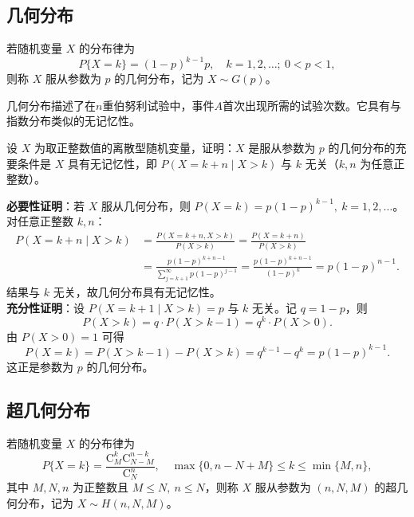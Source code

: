 ﻿\documentclass[lang=cn,11pt]{elegantbook}
\begin{document}
\subsection{几何分布} \label{subsec:geometric-dist}
\begin{definition}[几何分布] \label{def:geometric-dist}
若随机变量 $X$ 的分布律为
\[
P\{X = k\} = (1-p)^{k-1} p,\quad k=1,2,\dots;\ 0 < p < 1,
\]
则称 $X$ 服从参数为 $p$ 的几何分布，记为 $X \sim G(p)$。
\end{definition}

\begin{note}
几何分布描述了在$n$重伯努利试验中，事件$A$首次出现所需的试验次数。它具有与指数分布类似的无记忆性。
\end{note}

\begin{exercise}[几何分布的无记忆性] \label{exer:2-58}
设 $X$ 为取正整数值的离散型随机变量，证明：$X$ 是服从参数为 $p$ 的几何分布的充要条件是 $X$ 具有无记忆性，即 $P(X=k+n\mid X>k)$ 与 $k$ 无关（$k,n$ 为任意正整数）。
\end{exercise}

\begin{solution}
\textbf{必要性证明}：若 $X$ 服从几何分布，则 $P(X=k)=p(1-p)^{k-1},\ k=1,2,\dots$。对任意正整数 $k,n$：
\[
\begin{aligned}
P(X=k+n\mid X>k) &= \frac{P(X=k+n, X>k)}{P(X>k)} = \frac{P(X=k+n)}{P(X>k)} \\
&= \frac{p(1-p)^{k+n-1}}{\sum_{j=k+1}^{\infty}p(1-p)^{j-1}} = \frac{p(1-p)^{k+n-1}}{(1-p)^k} = p(1-p)^{n-1}.
\end{aligned}
\]
结果与 $k$ 无关，故几何分布具有无记忆性。\\
\textbf{充分性证明}：设 $P(X=k+1\mid X>k)=p$ 与 $k$ 无关。记 $q=1-p$，则
\[
P(X>k) = q\cdot P(X>k-1) = q^k\cdot P(X>0).
\]
由 $P(X>0)=1$ 可得
\[
P(X=k) = P(X>k-1) - P(X>k) = q^{k-1} - q^k = p(1-p)^{k-1}.
\]
这正是参数为 $p$ 的几何分布。
\end{solution}



\subsection{超几何分布} \label{subsec:hypergeo-dist}
\begin{definition}[超几何分布] \label{def:hypergeo-dist}
若随机变量 $X$ 的分布律为
\[
P\{X=k\} = \frac{\mathrm{C}_M^k \mathrm{C}_{N-M}^{n-k}}{\mathrm{C}_N^n},\quad \max\{0,n-N+M\} \le k \le \min\{M,n\},
\]
其中 $M,N,n$ 为正整数且 $M \le N,\ n \le N$，则称 $X$ 服从参数为 $(n,N,M)$ 的超几何分布，记为 $X \sim H(n,N,M)$。
\end{definition}
\end{document}
